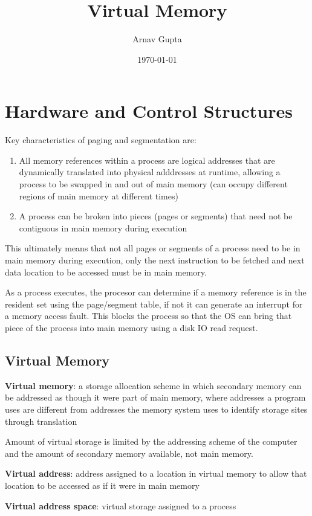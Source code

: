 \documentclass[11pt]{article}
\author{Arnav Gupta}
\date{\today}
\title{Virtual Memory}
\begin{document}
\maketitle
\tableofcontents

\section{Hardware and Control Structures}
\label{sec:org04fc85d}
Key characteristics of paging and segmentation are:
\begin{enumerate}
\item All memory references within a process are logical addresses that are dynamically
translated into physical adddresses at runtime, allowing a process to be swapped
in and out of main memory (can occupy different regions of main memory at
different times)
\item A process can be broken into pieces (pages or segments) that need not be contiguous
in main memory during execution
\end{enumerate}

This ultimately means that not all pages or segments of a process need to be in main
memory during execution, only the next instruction to be fetched and next data location
to be accessed must be in main memory.

As a process executes, the procesor can determine if a memory reference is in the
resident set using the page/segment table, if not it can generate an interrupt
for a memory access fault.
This blocks the process so that the OS can bring that piece of the process into
main memory using a disk IO read request.
\subsection{Virtual Memory}
\label{sec:orgf8b2ed3}
\textbf{Virtual memory}: a storage allocation scheme in which secondary memory can be addressed
as though it were part of main memory, where addresses a program uses are different from
addresses the memory system uses to identify storage sites through translation

Amount of virtual storage is limited by the addressing scheme of the computer and the
amount of secondary memory available, not main memory.

\textbf{Virtual address}: address assigned to a location in virtual memory to allow that location
to be accessed as if it were in main memory

\textbf{Virtual address space}: virtual storage assigned to a process
\end{document}
